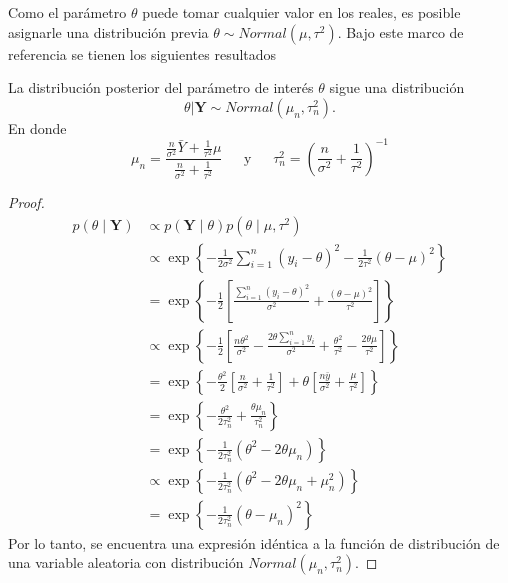 \documentclass[10pt,openright]{book}\usepackage[]{graphicx}\usepackage[]{color}
\begin{document}
    Como el par\'ametro $\theta$ puede tomar cualquier valor en los reales, es posible asignarle una distribuci\'on previa $\theta \sim Normal(\mu,\tau^2)$. Bajo este marco de referencia se tienen los siguientes resultados
    
    \begin{Res}\label{Res_pos_theta}
    La distribuci\'on posterior del par\'ametro de inter\'es $\theta$ sigue una distribuci\'on
    \begin{equation*}
    \theta|\mathbf{Y} \sim Normal(\mu_n,\tau^2_n).
    \end{equation*}
    En donde
    \begin{equation}\label{tau_sigma_n}
    \mu_n=\frac{\frac{n}{\sigma^2}\bar{Y}+\frac{1}{\tau^2}\mu}{\frac{n}{\sigma^2}+\frac{1}{\tau^2}}
    \ \ \ \ \ \ \ \text{y} \ \ \ \ \ \ \
    \tau_n^2=\left(\frac{n}{\sigma^2}+\frac{1}{\tau^2}\right)^{-1}
    \end{equation}
    \end{Res}
    
    \begin{proof}
    \begin{align*}
    p(\theta \mid \mathbf{Y})&\propto p(\mathbf{Y} \mid \theta)p(\theta \mid \mu,\tau^2)\\
    &\propto \exp\left\{-\frac{1}{2\sigma^2}\sum_{i=1}^n(y_i-\theta)^2-\frac{1}{2\tau^2}(\theta-\mu)^2\right\}\\
    &= \exp\left\{-\frac{1}{2}\left[\frac{\sum_{i=1}^n(y_i-\theta)^2}{\sigma^2}+\frac{(\theta-\mu)^2}{\tau^2}\right]\right\}\\
    &\propto \exp\left\{-\frac{1}{2}\left[\frac{n\theta^2}{\sigma^2}-\frac{2\theta\sum_{i=1}^ny_i}{\sigma^2}+\frac{\theta^2}{\tau^2}-\frac{2\theta\mu}{\tau^2}\right]\right\}\\
    &= \exp\left\{-\frac{\theta^2}{2}\left[\frac{n}{\sigma^2}+\frac{1}{\tau^2}\right]+
    \theta\left[\frac{n\bar{y}}{\sigma^2}+\frac{\mu}{\tau^2}\right]\right\}\\
    &= \exp\left\{-\frac{\theta^2}{2\tau^2_n}+\frac{\theta\mu_n}{\tau_n^2}\right\}\\
    &= \exp\left\{-\frac{1}{2\tau^2_n}(\theta^2-2\theta\mu_n)\right\}\\
    &\propto \exp\left\{-\frac{1}{2\tau^2_n}(\theta^2-2\theta\mu_n+\mu_n^2)\right\}\\
    &= \exp\left\{-\frac{1}{2\tau^2_n}(\theta-\mu_n)^2\right\}
    \end{align*}
    Por lo tanto, se encuentra una expresi\'on id\'entica a la funci\'on de distribuci\'on de una variable aleatoria con distribuci\'on $Normal(\mu_n,\tau_n^2)$.
    \end{proof}
    
\end{document}
